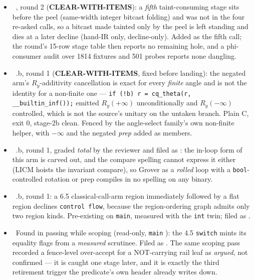 \begin{itemize}
    peeled \texttt{select} classical, on the assumption that taint follows the phi. It does not.
  \item \foverdecline\ , round 2 (\textbf{CLEAR-WITH-ITEMS}): a \emph{fifth} taint-consuming
    stage sits before the peel (same-width integer bitcast folding) and was not in the four re-asked
    calls, so a bitcast made tainted only by the peel is left standing and dies at a later decline
    (hand-IR only, decline-only). Added as the fifth call; the round's 15-row stage table then reports no
    remaining hole, and a phi-consumer audit over 1814 fixtures and 501 probes reports none dangling.
  \item \fconfirmed\ .b, round 1 (\textbf{CLEAR-WITH-ITEMS}, fixed before landing): the negated
    arm's \(R_y\)-additivity cancellation is exact for every \emph{finite} angle and is not the identity
    for a non-finite one --- \texttt{if (!b) r = cq\_theta(r, \_\_builtin\_inf());} emitted
    \(R_y(+\infty)\) unconditionally and \(R_y(-\infty)\) controlled, which is not the source's unitary on
    the untaken branch. Plain C, exit 0, stage-2b clean. Fenced by the angle-select family's own
    non-finite helper, with \(-\infty\) and the negated \emph{prep} added as members.
  \item \foverdecline\ .b, round 1, graded \emph{total} by the reviewer and filed as :
    the in-loop form of this arm is carved out, and the compare spelling cannot express it either
    (LICM hoists the invariant compare), so Grover as a \emph{rolled} loop with a \texttt{bool}-controlled
    rotation or prep compiles in no spelling on any binary.
  \item \foverdecline\ .b, round 1: a 6.5 classical-call-arm region immediately followed by a
    flat region declines \texttt{control flow}, because the region-ordering graph admits only two region
    kinds. Pre-existing on \texttt{main}, measured with the \texttt{int} twin; filed as .
  \item \fpreexisting\ Found in passing while scoping (read-only, \texttt{main} ): the 4.5
    \texttt{switch} mints its equality flags from a \emph{measured} scrutinee. Filed as . The
    same scoping pass recorded a fence-level over-accept for a NOT-carrying rail leaf as \emph{argued},
    not confirmed --- it is caught one stage later, and it is exactly the third retirement trigger the
    predicate's own header already writes down.
\end{itemize}


